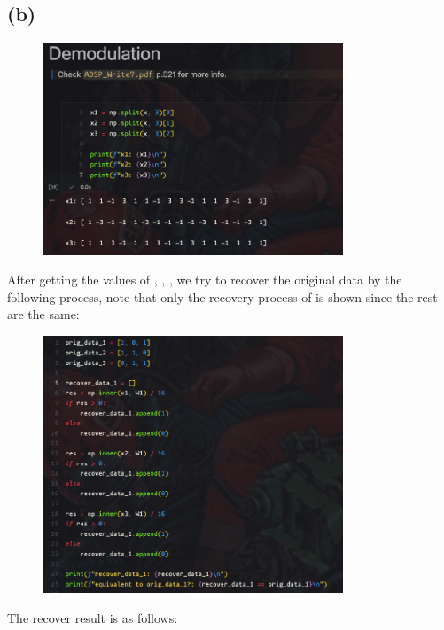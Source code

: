 \documentclass{article}
\begin{document}
\subsection*{(b)}

\begin{figure}[H]
    \centering
    \includegraphics[width=0.8\textwidth]{HW5_img/7/demodulation.png}
\end{figure}

After getting the values of , , , 
we try to recover the original data by the following process, 
note that only the recovery process of \codeword{[1 0 1]} is shown since the rest are the same:

\begin{figure}[H]
    \centering
    \includegraphics[width=0.8\textwidth]{HW5_img/7/recover_process.png}
\end{figure}

The recover result is as follows:
\end{document}
